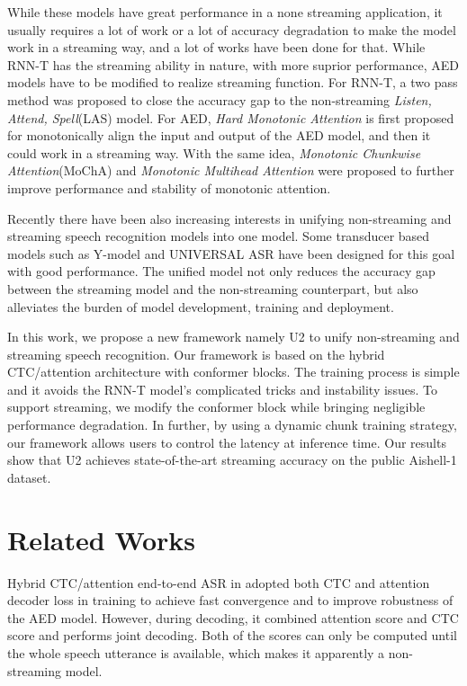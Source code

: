 \documentclass[a4paper]{article}
\begin{document}
While these models have great performance in a none streaming application, it usually requires a lot of work or a lot of accuracy degradation to make the model work in a streaming way, and a lot of works have been done for that.
While RNN-T has the streaming ability in nature, with more suprior performance, AED models have to be modified to realize streaming function.
For RNN-T, a two pass\cite{sainath2019two,sainath2020streaming} method was proposed to close the accuracy gap to the non-streaming \textit{Listen, Attend, Spell}(LAS) model.
For AED, \textit{Hard Monotonic Attention}\cite{raffel2017online} is first proposed for monotonically align the input and output of the AED model, and then it could work in a streaming way. With the same idea, \textit{Monotonic Chunkwise Attention}(MoChA)\cite{chiu2017monotonic} and \textit{Monotonic Multihead Attention}\cite{inaguma2020enhancing} were proposed to further improve performance and stability of monotonic attention. 

Recently there have been also increasing interests in unifying non-streaming and streaming speech recognition models into one model. Some transducer based models such as Y-model \cite{tripathi2020transformer} and UNIVERSAL ASR\cite{yu2020universal} have been designed for this goal with good performance. The unified model not only reduces the accuracy gap between the streaming model and the non-streaming counterpart, but also alleviates the burden of model development, training and deployment. 

In this work, we propose a new framework namely U2 to unify non-streaming and streaming speech recognition. Our framework is based on the hybrid CTC/attention architecture with conformer blocks. The training process is simple and it avoids the RNN-T model's complicated tricks and instability issues. To support streaming, we modify the conformer block while bringing negligible performance degradation. In further, by using a dynamic chunk training strategy, our framework allows users to control the latency at inference time. Our results show that U2 achieves state-of-the-art streaming accuracy on the public Aishell-1 dataset\cite{bu2017aishell}.


\section{Related Works}

Hybrid CTC/attention end-to-end ASR in \cite{kim2017joint} adopted both CTC and attention decoder loss in training to achieve fast convergence and to improve robustness of the AED model. However, during decoding, it combined attention score and CTC score and performs joint decoding. Both of the scores can only be computed until the whole speech utterance is available, which makes it apparently a non-streaming model.
\end{document}
